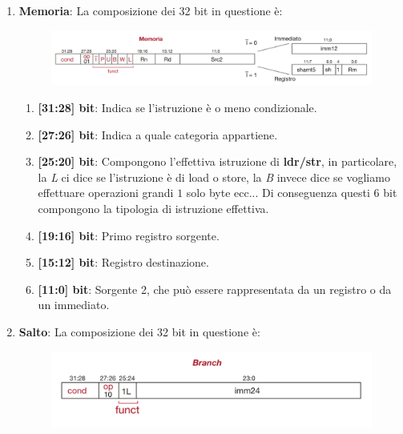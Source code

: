 \documentclass{article}
\begin{document}
\begin{enumerate}
    \newpage
    
    \item \textbf{Memoria}: La composizione dei 32 bit in questione è:
    
    \begin{figure}[htbp]
        \center
        \includegraphics[scale=0.22]{img/istrMemoria.png}
    \end{figure}

    \begin{enumerate}
        \item \textbf{[31:28] bit}: Indica se l'istruzione è o meno condizionale.
        \vspace*{8px}
        \item \textbf{[27:26] bit}: Indica a quale categoria appartiene.
        \vspace*{8px}
        \item \textbf{[25:20] bit}: Compongono l'effettiva istruzione di \textbf{ldr/str}, in particolare, la \textit{L} ci dice se l'istruzione è di load o store, la \textit{B} invece dice se vogliamo effettuare operazioni grandi $1$ solo byte ecc... Di conseguenza questi $6$ bit compongono la tipologia di istruzione effettiva. 
        \vspace*{8px}
        \item \textbf{[19:16] bit}: Primo registro sorgente.
        \vspace*{8px}
        \item \textbf{[15:12] bit}: Registro destinazione.
        \vspace*{8px}
        \item \textbf{[11:0] bit}: Sorgente 2, che può essere rappresentata da un registro o da un immediato.
    \end{enumerate}

    \item \textbf{Salto}: La composizione dei 32 bit in questione è:
    
    \begin{figure}[htbp]
        \center
        \includegraphics[scale=0.22]{img/istrSalto.png}
    \end{figure}


\end{enumerate}
\end{document}
